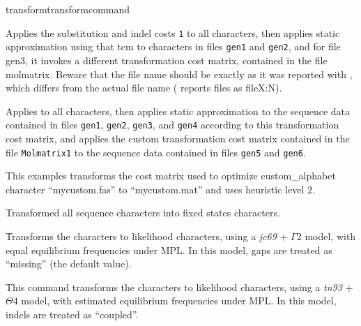 \begin{command}{transform}{transformcommand}
\begin{poyexamples}
            	{Applies the substitution and indel costs \texttt{1} to all characters, then applies static approximation
            	using that tcm to characters in files \texttt{gen1} and \texttt{gen2}, and for file
            	gen3, it invokes a different transformation cost matrix, contained
            	in the file molmatrix. Beware that the file name should be exactly
            	as it was reported with , which differs from the actual
            	file name ( reports files as fileX:N).}
		
            	{Applies  to all characters, then applies
            	static approximation to the sequence data contained in files \texttt{gen1}, \texttt{gen2},
            	\texttt{gen3}, and \texttt{gen4} according to this transformation cost
            	matrix, and applies the custom transformation cost matrix contained in the file
            	\texttt{Molmatrix1} to the sequence data contained in files \texttt{gen5} and
            	\texttt{gen6}.}
         
		{This examples transforms the cost matrix used to optimize custom\_alphabet 
		character ``mycustom.fas'' to ``mycustom.mat'' and uses heuristic level $2$.}
         
        		 {Transformed all sequence characters into fixed states characters.}
		 
		 {Transforms the characters to  likelihood characters, using a \emph{jc69} + $\Gamma 2$ model, 
		 with equal equilibrium frequencies under MPL. In this model, gaps are treated as ``missing'' (the default value).}

		 {This command transforms the characters to likelihood characters, using a \emph{tn93} + $\Theta 4$ model, 
		 with estimated equilibrium frequencies under MPL. In this model, indels are treated as ``coupled''.}


\end{poyexamples}
\end{command}
